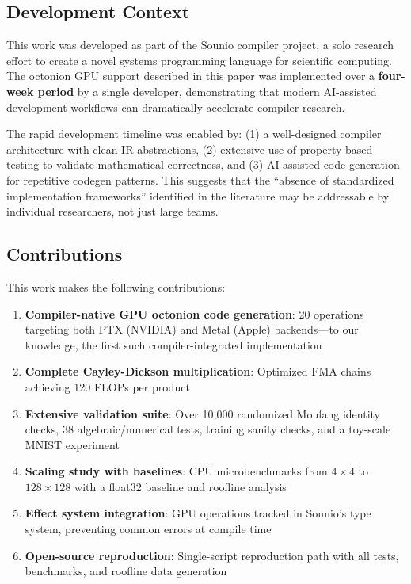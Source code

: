 \documentclass[11pt,a4paper]{article}
\begin{document}
\subsection{Development Context}

This work was developed as part of the Sounio compiler project, a solo research effort to create a novel systems programming language for scientific computing. The octonion GPU support described in this paper was implemented over a \textbf{four-week period} by a single developer, demonstrating that modern AI-assisted development workflows can dramatically accelerate compiler research.

The rapid development timeline was enabled by: (1) a well-designed compiler architecture with clean IR abstractions, (2) extensive use of property-based testing to validate mathematical correctness, and (3) AI-assisted code generation for repetitive codegen patterns. This suggests that the ``absence of standardized implementation frameworks'' identified in the literature may be addressable by individual researchers, not just large teams.

\subsection{Contributions}

This work makes the following contributions:

\begin{enumerate}
    \item \textbf{Compiler-native GPU octonion code generation}: 20 operations targeting both PTX (NVIDIA) and Metal (Apple) backends---to our knowledge, the first such compiler-integrated implementation
    \item \textbf{Complete Cayley-Dickson multiplication}: Optimized FMA chains achieving 120 FLOPs per product
    \item \textbf{Extensive validation suite}: Over 10{,}000 randomized Moufang identity checks, 38 algebraic/numerical tests, training sanity checks, and a toy-scale MNIST experiment
    \item \textbf{Scaling study with baselines}: CPU microbenchmarks from $4 \times 4$ to $128 \times 128$ with a float32 baseline and roofline analysis
    \item \textbf{Effect system integration}: GPU operations tracked in Sounio's type system, preventing common errors at compile time
    \item \textbf{Open-source reproduction}: Single-script reproduction path with all tests, benchmarks, and roofline data generation
\end{enumerate}
\end{document}
